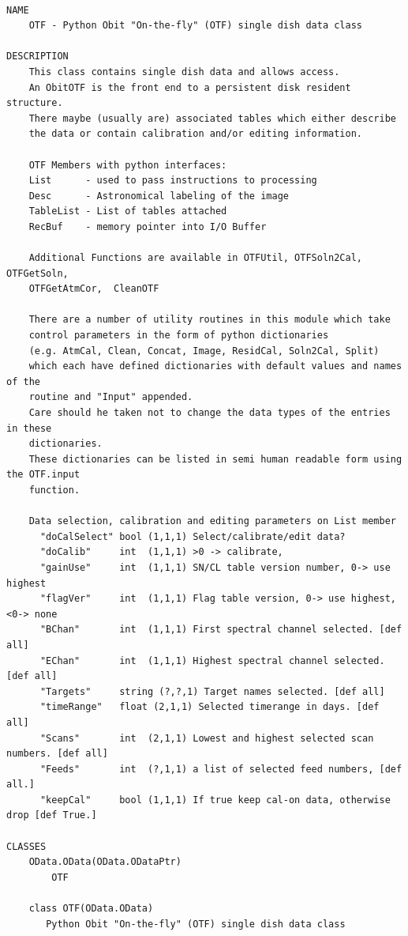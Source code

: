 \documentclass[11pt]{report}
\begin{document}
\begin{verbatim}

NAME
    OTF - Python Obit "On-the-fly" (OTF) single dish data class

DESCRIPTION
    This class contains single dish data and allows access.
    An ObitOTF is the front end to a persistent disk resident structure.
    There maybe (usually are) associated tables which either describe
    the data or contain calibration and/or editing information.
    
    OTF Members with python interfaces:
    List      - used to pass instructions to processing
    Desc      - Astronomical labeling of the image 
    TableList - List of tables attached
    RecBuf    - memory pointer into I/O Buffer
    
    Additional Functions are available in OTFUtil, OTFSoln2Cal, OTFGetSoln,
    OTFGetAtmCor,  CleanOTF
    
    There are a number of utility routines in this module which take
    control parameters in the form of python dictionaries
    (e.g. AtmCal, Clean, Concat, Image, ResidCal, Soln2Cal, Split)
    which each have defined dictionaries with default values and names of the
    routine and "Input" appended.
    Care should he taken not to change the data types of the entries in these
    dictionaries.
    These dictionaries can be listed in semi human readable form using the OTF.input
    function.

    Data selection, calibration and editing parameters on List member
      "doCalSelect" bool (1,1,1) Select/calibrate/edit data?
      "doCalib"     int  (1,1,1) >0 -> calibrate,
      "gainUse"     int  (1,1,1) SN/CL table version number, 0-> use highest
      "flagVer"     int  (1,1,1) Flag table version, 0-> use highest, <0-> none
      "BChan"       int  (1,1,1) First spectral channel selected. [def all]
      "EChan"       int  (1,1,1) Highest spectral channel selected. [def all]
      "Targets"     string (?,?,1) Target names selected. [def all]
      "timeRange"   float (2,1,1) Selected timerange in days. [def all]
      "Scans"       int  (2,1,1) Lowest and highest selected scan numbers. [def all]
      "Feeds"       int  (?,1,1) a list of selected feed numbers, [def all.]
      "keepCal"     bool (1,1,1) If true keep cal-on data, otherwise drop [def True.]

CLASSES
    OData.OData(OData.ODataPtr)
        OTF
    
    class OTF(OData.OData)
       Python Obit "On-the-fly" (OTF) single dish data class
       

\end{verbatim}
\end{document}
